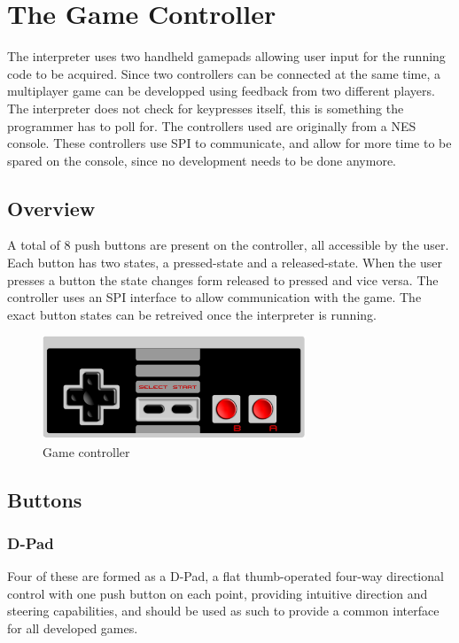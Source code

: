 \chapter{The Game Controller}
\label{cha:gameController}

The interpreter uses two handheld gamepads allowing user input for the running code to be acquired. Since two controllers can be connected at the same time, a multiplayer game can be developped using feedback from two different players. The interpreter does not check for keypresses itself, this is something the programmer has to poll for.
The controllers used are originally from a NES console. These controllers use SPI to communicate, and allow for more time to be spared on the console, since no development needs to be done anymore.

\section{Overview}
A total of 8 push buttons are present on the controller, all accessible by the user. Each button has two states, a pressed-state and a released-state. When the user presses a button the state changes form released to pressed and vice versa. The controller uses an SPI interface to allow communication with the game. The exact button states can be retreived once the interpreter is running.

\begin{figure}[h]
    \centering
	\includegraphics[width=0.7\textwidth]{GameController/GameControllerPicture.PNG}
    \caption{Game controller}\par
    \label{fig:GameController}
\end{figure}

\section{Buttons}
\subsection{D-Pad}
Four of these are formed as a D-Pad, a flat thumb-operated four-way directional control with one push button on each point, providing intuitive direction and steering capabilities, and should be used as such to provide a common interface for all developed games.

